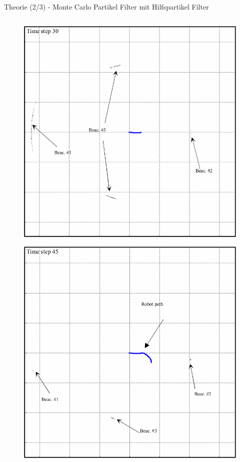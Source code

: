 \documentclass{beamer}
\begin{document}
\begin{frame}{Theorie (2/3) - Monte Carlo Partikel Filter mit Hilfspartikel Filter}
\begin{columns}
\begin{overlayarea}{\textwidth}{.9\textheight}
{\begin{figure}
						\caption{\cite{blanco2008pure}}
					\end{figure}
				}
				{
					\begin{figure}
						\centering
						\includegraphics[width=\linewidth]{blanco2008pure_fig3g}
						\caption{\cite{blanco2008pure}}
					\end{figure}
				}
				{
					\begin{figure}
						\centering
						\includegraphics[width=\linewidth]{blanco2008pure_fig3h}

\end{figure}}
\end{overlayarea}
\end{columns}
\end{frame}
\end{document}
